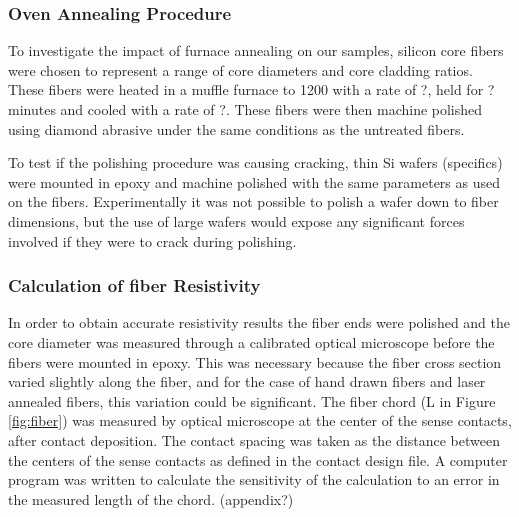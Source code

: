 \subsubsection{Oven Annealing Procedure}

To investigate the impact of furnace annealing on our samples, silicon core fibers were chosen to represent a range of core diameters and core cladding ratios. These fibers were heated in a muffle furnace to 1200 with a rate of ?, held for ? minutes and cooled with a  rate of ?. These fibers were then machine polished using diamond abrasive under the same conditions as the untreated fibers. 

To test if the polishing procedure was causing cracking, thin Si wafers (specifics) were mounted in epoxy and machine polished with the same parameters as used on the fibers. Experimentally it was not possible to polish a wafer down to fiber dimensions, but the use of large wafers would expose any significant forces involved if they were to crack during polishing.





\subsubsection{Calculation of fiber Resistivity}
In order to obtain accurate resistivity results the fiber ends were polished and the core diameter was measured through a calibrated optical microscope before the fibers were mounted in epoxy. This was necessary because the fiber cross section varied slightly along the fiber, and for the case of hand drawn fibers and laser annealed fibers, this variation could be significant. The fiber chord (L in Figure \ref{fig:fiber}) was measured by optical microscope at the center of the sense contacts, after contact deposition. The contact spacing was taken as the distance between the centers of the sense contacts as defined in the contact design file. A computer program was written to calculate the sensitivity of the calculation to an error in the measured length of the chord. (appendix?)

 \cleardoublepage